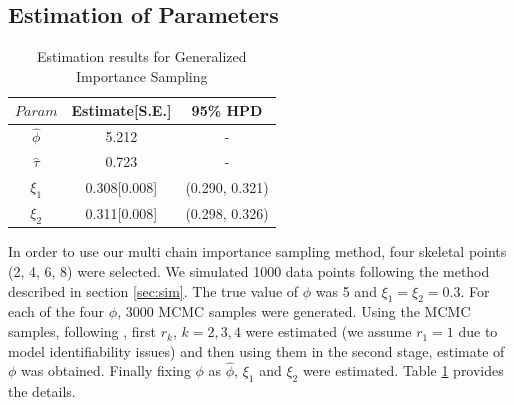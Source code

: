 \documentclass[11pt]{article}
\theoremstyle{remboldstyle}
\begin{document}
\subsection{Estimation of Parameters}
\begin{table}[H]
\caption{Estimation results for Generalized Importance Sampling}
\centering
\begin{tabular}{c c c }
\hline
$Param$      & Estimate[S.E.] & 95\% HPD\\
\hline
$\hat{\phi}$ &  5.212         & -\\
$\hat{\tau}$ &  0.723         & -\\
$\xi_1$      & 0.308[0.008]        & (0.290, 0.321)\\   
$\xi_2$      & 0.311[0.008]        & (0.298, 0.326)\\
  \hline           
\end{tabular}
\label{tab2}
\end{table}
\noindent
In order to use our multi chain importance sampling method, four skeletal points (2, 4, 6, 8) were selected. We simulated 1000 data points following the method described in section \ref{sec:sim}. The true value of $\phi$ was 5 and $\xi_1 = \xi_2 = 0.3$. For each of the four $\phi$, 3000 MCMC samples were generated. Using the MCMC samples, following \cite{geyer:1994}, first $r_k$, $k = 2, 3, 4$ were estimated (we assume $r_1 = 1$ due to model identifiability issues) and then using them in the second stage, estimate of $\phi$ was obtained. Finally fixing $\phi$ as $\hat{\phi}$, $\xi_1$ and $\xi_2$ were estimated. Table \ref{tab2} provides the details.
\end{document}
